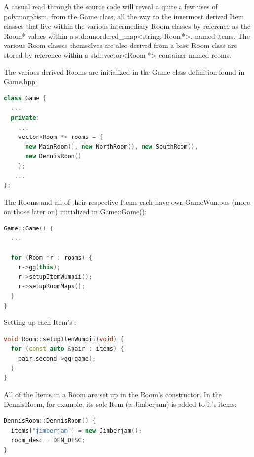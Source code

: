 \documentclass[man,12pt]{apa6}
\begin{document}
A casual
read through the source code will reveal a quite a few uses of polymorphism, from the
\textsf{Game} class, all the way to the innermost derived \textsf{Item} classes
that live within the various intermediary \textsf{Room} classes by reference as
the \textsf{Room*} values within a \textsf{std::unordered\_map<string, Room*>},
named \textsf{items}.  The various \textsf{Room} classes themselves are also
derived from a base \textsf{Room} class are stored by reference within a
\textsf{std::vector<Room *>} container named \textsf{rooms}.

The various derived \textsf{Room}s are initialized in the \textsf{Game} class
definition found in \textsf{Game.hpp}:

\begin{framed}
\begin{lstlisting}[language=C++]
class Game {
  ...
  private:
    ...
    vector<Room *> rooms = {
      new MainRoom(), new NorthRoom(), new SouthRoom(),
      new DennisRoom()
    };
   ...
};
\end{lstlisting}
\end{framed}

The \textsf{Room}s and all of their respective \textsf{Item}s each have own
\textsf{GameWumpus} (more on those later on) initialized in
\textsf{Game::Game()}:

\begin{framed}
\begin{lstlisting}[language=C++]
Game::Game() {
  ...

  for (Room *r : rooms) {
    r->gg(this);
    r->setupItemWumpii();
    r->setupRoomMaps();
  }
}
\end{lstlisting}
\end{framed}

Setting up each \textsf{Item}'s :

\begin{framed}
\begin{lstlisting}[language=C++]
void Room::setupItemWumpii(void) {
  for (const auto &pair : items) {
    pair.second->gg(game);
  }
}
\end{lstlisting}
\end{framed}

All of the \textsf{Item}s in a \textsf{Room} are set up in the \textsf{Room}'s
constructor.  In the \textsf{DennisRoom}, for example, its sole \textsf{Item}
(a \textsf{Jimberjam}) is added to it's \textsf{items}:

\begin{framed}
\begin{lstlisting}[language=C++]
DennisRoom::DennisRoom() {
  items["jimberjam"] = new Jimberjam();
  room_desc = DEN_DESC;
}
\end{lstlisting}
\end{framed}
\end{document}
